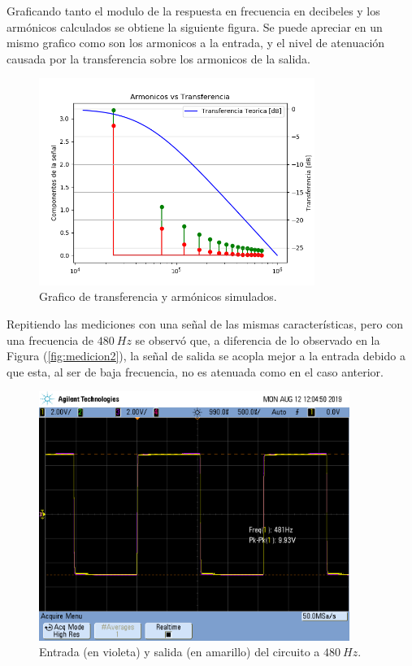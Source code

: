\documentclass[a4paper]{article}
\begin{document}
Graficando tanto el modulo de la respuesta en frecuencia en decibeles y los armónicos calculados se obtiene la siguiente figura. Se puede apreciar en un  mismo grafico como son los armonicos a la entrada, y el nivel de atenuación causada por la transferencia sobre los armonicos de la salida.  

\begin{figure}[H]
	\centering
	\includegraphics[width=0.8\textwidth]{ArmonicosVsTransferencia}
\caption{Grafico de transferencia y armónicos simulados.}
	\label{fig:aromincosvstransf}
\end{figure}

Repitiendo las mediciones con una señal de las mismas características, pero con una frecuencia de $ 480 \ Hz $ se observó que, a diferencia de lo observado en la Figura (\ref{fig:medicion2}), la señal de salida se acopla mejor a la entrada debido a que esta, al ser de baja frecuencia, no es atenuada como en el caso anterior.

\begin{figure}[H]
	\centering
	\includegraphics[width=0.9\textwidth , trim={0.7cm 6.25cm  0 3.5cm},clip]{scope_3}
\caption{Entrada (en violeta) y salida (en amarillo) del circuito a $ 480 \ Hz $.}
	\label{fig:medicion2bajasf}
\end{figure}
\end{document}
